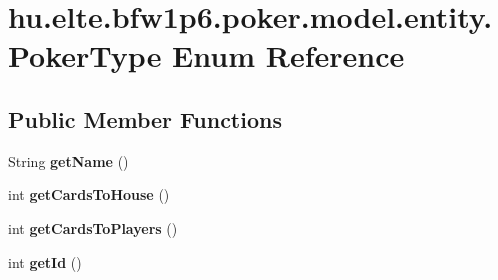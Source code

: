 \hypertarget{enumhu_1_1elte_1_1bfw1p6_1_1poker_1_1model_1_1entity_1_1_poker_type}{}\section{hu.\+elte.\+bfw1p6.\+poker.\+model.\+entity.\+Poker\+Type Enum Reference}
\label{enumhu_1_1elte_1_1bfw1p6_1_1poker_1_1model_1_1entity_1_1_poker_type}
\subsection*{Public Member Functions}
\begin{DoxyCompactItemize}
\item 
\hypertarget{enumhu_1_1elte_1_1bfw1p6_1_1poker_1_1model_1_1entity_1_1_poker_type_a51f64397f9bd8150a8f29798803c5f1b}{}String {\bfseries get\+Name} ()\label{enumhu_1_1elte_1_1bfw1p6_1_1poker_1_1model_1_1entity_1_1_poker_type_a51f64397f9bd8150a8f29798803c5f1b}

\item 
\hypertarget{enumhu_1_1elte_1_1bfw1p6_1_1poker_1_1model_1_1entity_1_1_poker_type_a765fea0964cebf1b20ce6f6844576127}{}int {\bfseries get\+Cards\+To\+House} ()\label{enumhu_1_1elte_1_1bfw1p6_1_1poker_1_1model_1_1entity_1_1_poker_type_a765fea0964cebf1b20ce6f6844576127}

\item 
\hypertarget{enumhu_1_1elte_1_1bfw1p6_1_1poker_1_1model_1_1entity_1_1_poker_type_ab97c13c45b77e606aafd61e106769256}{}int {\bfseries get\+Cards\+To\+Players} ()\label{enumhu_1_1elte_1_1bfw1p6_1_1poker_1_1model_1_1entity_1_1_poker_type_ab97c13c45b77e606aafd61e106769256}

\item 
\hypertarget{enumhu_1_1elte_1_1bfw1p6_1_1poker_1_1model_1_1entity_1_1_poker_type_abab4c6279faec7f729ef588b5430b0cd}{}int {\bfseries get\+Id} ()\label{enumhu_1_1elte_1_1bfw1p6_1_1poker_1_1model_1_1entity_1_1_poker_type_abab4c6279faec7f729ef588b5430b0cd}

\end{DoxyCompactItemize}
